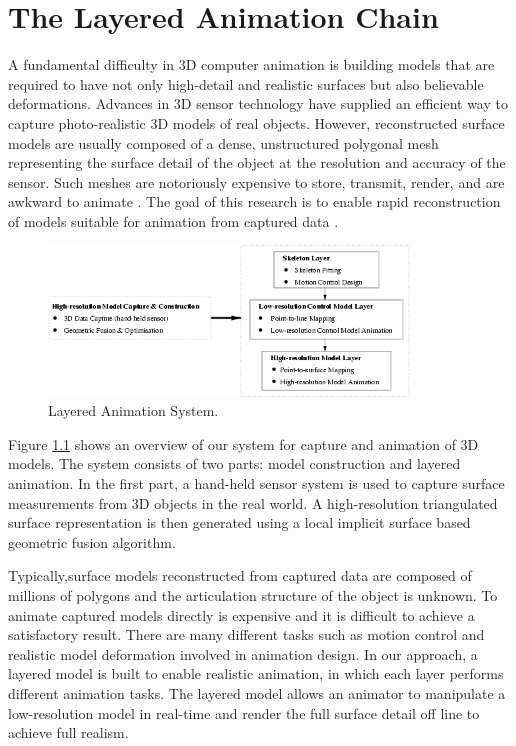 \documentclass[10pt,oneside,fleqn,a4paper]{book}
\begin{document}
\chapter{\label{ch:animationchain}The Layered Animation Chain}
A fundamental difficulty in 3D computer animation is building models that are required to have not only high-detail and realistic surfaces but also believable deformations. Advances in 3D sensor technology have supplied an efficient way to capture photo-realistic 3D models of real objects. However, reconstructed surface models are usually composed of a dense, unstructured polygonal mesh representing the surface detail of the object at the resolution and accuracy of the sensor. Such meshes are notoriously expensive to store, transmit, render, and are awkward to animate \cite{Thalmann96}. The goal of this research is to enable rapid reconstruction of models suitable for animation from captured data \cite{Sun99}.

\begin{figure}
\begin{center}
\includegraphics[height=4cm]{../images/chain_overview}
\caption[Layered Animation System]{\label{fig:chainoverview} Layered Animation System.}
\end{center}
\end{figure}

Figure \ref{fig:chainoverview} shows an overview of our system for capture and animation of 3D models. The system consists of two parts: model construction and layered animation. In the first part, a hand-held sensor system is used to capture surface measurements from 3D objects in the real world. A high-resolution triangulated surface representation is then generated using a local implicit surface based geometric fusion algorithm.

Typically,surface models  reconstructed from captured data are composed of millions of polygons and the articulation structure of the object is unknown. To animate captured models directly is expensive and it is difficult to achieve a satisfactory result. There are many different tasks such as motion control and realistic model deformation involved in animation design. In our approach, a layered model is built to enable realistic animation, in which each layer performs different animation tasks. The layered model allows an animator to manipulate a low-resolution model in real-time and render the full surface detail off line to achieve full realism.
\end{document}
